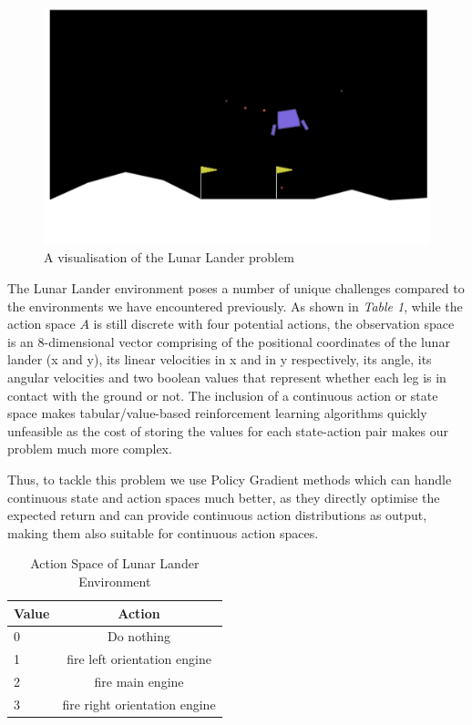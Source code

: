 \documentclass{article}
\begin{document}
\begin{figure}[htbp]
\centering
\includegraphics[width=0.7\linewidth]{Report/images/01.visualisation.png}
\caption{\label{fig:Visualization of the Cart-pole} A visualisation of the Lunar Lander problem}
\end{figure}


The Lunar Lander environment poses a number of unique challenges compared to the environments we have encountered previously. As shown in \emph{Table 1}, while the action space $A$ is still discrete with four potential actions, the observation space is an 8-dimensional vector comprising of the positional coordinates of the lunar lander (x and y), its linear velocities in x and in y respectively, its angle, its angular velocities and two boolean values that represent whether each leg is in contact with the ground or not. The inclusion of a continuous action or state space makes tabular/value-based reinforcement learning algorithms quickly unfeasible as the cost of storing the values for each state-action pair makes our problem much more complex. 
\par Thus, to tackle this problem we use Policy Gradient methods which can handle continuous state and action spaces much better, as they directly optimise the expected return and can provide continuous action distributions as output, making them also suitable for continuous action spaces.

\begin{table}[htbp]
\centering
\begin{tabular}{|l|c|}
\hline
\textbf{Value} & \textbf{Action} \\
\hline
0  & Do nothing \\
\hline
1 & fire left orientation engine \\
\hline
2  & fire main engine \\
\hline
3 & fire right orientation engine  \\
\hline
\end{tabular}
\caption{Action Space of Lunar Lander Environment}
\label{tab:hyper-parameters}
\end{table}
\end{document}
